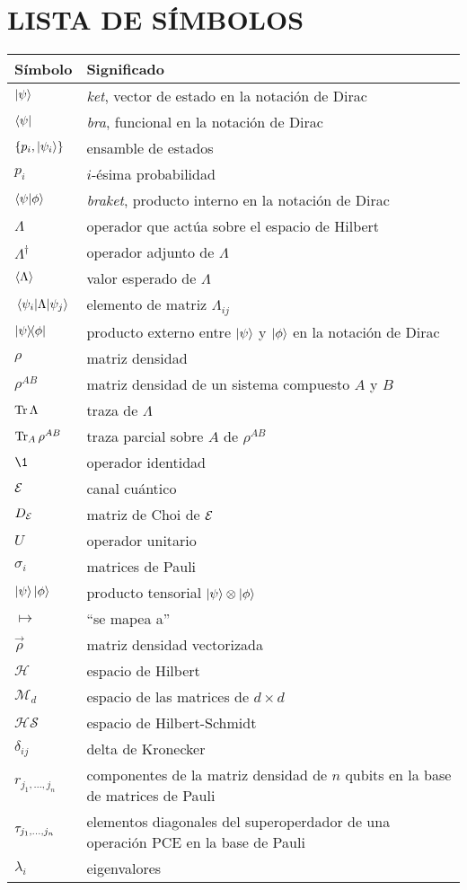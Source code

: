 

\chapter{LISTA DE SÍMBOLOS}

\begin{longtable}{@{}l@{\extracolsep{\fill}} p{4.75in} @{}}  %
  \textsf{Símbolo} & \textsf{Significado}\\[12pt]
  \endhead
  $\ket{\psi}$ &  \textit{ket}, vector de estado en la notación de Dirac \\
  $\bra{\psi}$ & \textit{bra}, funcional en la notación de Dirac\\
  $\qty{p_i,\ket{\psi_i}}$ & ensamble de estados \\
  $p_i$ & $i$-ésima probabilidad\\
  $\braket{\psi}{\phi}$ & \textit{braket}, producto interno en la notación de Dirac\\
  $\Lambda$ &  operador que actúa sobre el espacio de Hilbert\\
  $\Lambda^{\dagger}$ & operador adjunto de $\Lambda$\\
  $\expval{\Lambda}$ & valor esperado de $\Lambda$\\
  $\matrixel{\psi_i}{\Lambda}{\psi_j}$ & elemento de matriz $\Lambda_{ij}$\\
  $\dyad{\psi}{\phi}$ & producto externo entre $\ket{\psi}$ y $\ket{\phi}$ en la notación de Dirac \\
  $\rho$ & matriz densidad\\
  $\rho^{AB}$ & matriz densidad de un sistema compuesto $A$ y $B$\\
  $\Tr \Lambda$ & traza de $\Lambda$\\
  $\Tr_{A}\rho^{AB}$ & traza parcial sobre $A$ de $\rho^{AB}$\\
  	$\1$ & operador identidad \\
	$\mathcal{E}$ & canal cuántico \\
	$D_{\mathcal{E}}$ & matriz de Choi de $\mathcal{E}$\\
	$U$ & operador unitario \\
	$\sigma_i$ & matrices de Pauli\\
	$\ket{\psi}\ket{\phi}$ & producto tensorial $\ket{\psi}\otimes\ket{\phi}$\\
	$\mapsto$ & ``se mapea a''\\
	$\vec\rho$ & matriz densidad vectorizada\\
	$\mathcal{H}$ & espacio de Hilbert\\
	$\mathcal{M}_d$ & espacio de las matrices de $d\times d$\\
	$\mathcal{HS}$ & espacio de Hilbert-Schmidt\\
	$\delta_{ij}$ & delta de Kronecker\\
	$r_{j_1,\ldots,j_n}$ & componentes de la matriz densidad de $n$ qubits en la base
	de matrices de Pauli \\
	$\tau_{j_1,\ldots ,j_n}$ & elementos diagonales del superoperdador de una operación 
	PCE en la base de Pauli\\
	$\lambda_i$ & eigenvalores
\end{longtable}
